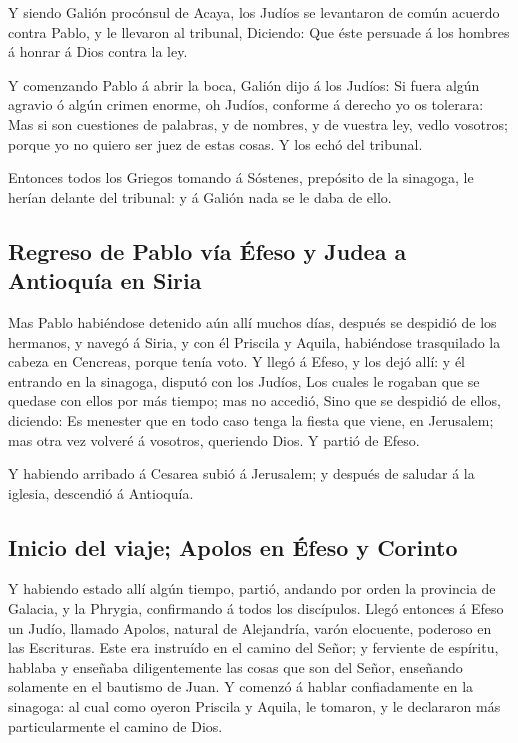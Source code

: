  Y siendo Galión procónsul de Acaya, los Judíos se
levantaron de común acuerdo contra Pablo, y le llevaron al tribunal,
 Diciendo: Que éste persuade á los hombres á honrar á
Dios contra la ley.

 Y comenzando Pablo á abrir la boca, Galión dijo á los
Judíos: Si fuera algún agravio ó algún crimen enorme, oh Judíos,
conforme á derecho yo os tolerara:  Mas si son cuestiones
de palabras, y de nombres, y de vuestra ley, vedlo vosotros; porque yo
no quiero ser juez de estas cosas.  Y los echó del
tribunal.

 Entonces todos los Griegos tomando á Sóstenes, prepósito
de la sinagoga, le herían delante del tribunal: y á Galión nada se le
daba de ello.

\hypertarget{regreso-de-pablo-vuxeda-uxe9feso-y-judea-a-antioquuxeda-en-siria}{%
\subsection{Regreso de Pablo vía Éfeso y Judea a Antioquía en
Siria}\label{regreso-de-pablo-vuxeda-uxe9feso-y-judea-a-antioquuxeda-en-siria}}

 Mas Pablo habiéndose detenido aún allí muchos días,
después se despidió de los hermanos, y navegó á Siria, y con él Priscila
y Aquila, habiéndose trasquilado la cabeza en Cencreas, porque tenía
voto.  Y llegó á Efeso, y los dejó allí: y él entrando en
la sinagoga, disputó con los Judíos,  Los cuales le
rogaban que se quedase con ellos por más tiempo; mas no accedió,
 Sino que se despidió de ellos, diciendo: Es menester que
en todo caso tenga la fiesta que viene, en Jerusalem; mas otra vez
volveré á vosotros, queriendo Dios. Y partió de Efeso.

 Y habiendo arribado á Cesarea subió á Jerusalem; y
después de saludar á la iglesia, descendió á Antioquía.

\hypertarget{inicio-del-viaje-apolos-en-uxe9feso-y-corinto}{%
\subsection{Inicio del viaje; Apolos en Éfeso y
Corinto}\label{inicio-del-viaje-apolos-en-uxe9feso-y-corinto}}

 Y habiendo estado allí algún tiempo, partió, andando por
orden la provincia de Galacia, y la Phrygia, confirmando á todos los
discípulos.  Llegó entonces á Efeso un Judío, llamado
Apolos, natural de Alejandría, varón elocuente, poderoso en las
Escrituras.  Este era instruído en el camino del Señor; y
ferviente de espíritu, hablaba y enseñaba diligentemente las cosas que
son del Señor, enseñando solamente en el bautismo de Juan.
 Y comenzó á hablar confiadamente en la sinagoga: al cual
como oyeron Priscila y Aquila, le tomaron, y le declararon más
particularmente el camino de Dios.

